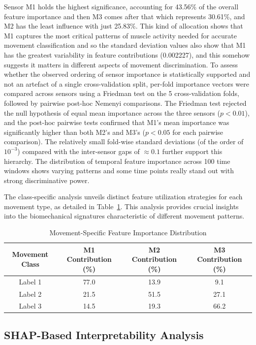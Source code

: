 \documentclass{elektr}
\newcommand{\yh}[1]{#1}
\begin{document}
Sensor M1 holds the highest significance, accounting for 43.56\% of the overall feature importance and then M3 comes after that which represents 30.61\%, and M2 has the least influence with just 25.83\%. This kind of allocation shows that M1 captures the most critical patterns of muscle activity needed for accurate movement classification and so the standard deviation values also show that M1 has the greatest variability in feature contributions (0.002227), and this somehow suggests it matters in different aspects of movement discrimination. \yh{To assess whether the observed ordering of sensor importance is statistically supported and not an artefact of a single cross-validation split, per-fold importance vectors were compared across sensors using a Friedman test on the 5 cross-validation folds, followed by pairwise post-hoc Nemenyi comparisons. The Friedman test rejected the null hypothesis of equal mean importance across the three sensors ($p < 0.01$), and the post-hoc pairwise tests confirmed that M1's mean importance was significantly higher than both M2's and M3's ($p < 0.05$ for each pairwise comparison). The relatively small fold-wise standard deviations (of the order of $10^{-3}$) compared with the inter-sensor gaps of $\approx 0.1$ further support this hierarchy.} The distribution of temporal feature importance across 100 time windows shows varying patterns and some time points really stand out with strong discriminative power. 

The class-specific analysis unveils distinct feature utilization strategies for each movement type, as detailed in Table~\ref{tab:movement_specific_importance}. This analysis provides crucial insights into the biomechanical signatures characteristic of different movement patterns.

\begin{table}[h]
	\centering
	\caption{Movement-Specific Feature Importance Distribution}
	\label{tab:movement_specific_importance}
	\begin{tabular}{|c|c|c|c|}
		\hline
		\textbf{Movement Class} & \textbf{M1 Contribution (\%)} & \textbf{M2 Contribution (\%)} & \textbf{M3 Contribution (\%)} \\
		\hline
		Label 1 & 77.0 & 13.9 & 9.1 \\
		Label 2 & 21.5 & 51.5 & 27.1 \\
		Label 3 & 14.5 & 19.3 & 66.2 \\
		\hline
	\end{tabular}
\end{table}
\subsection{SHAP-Based Interpretability Analysis}
\end{document}
